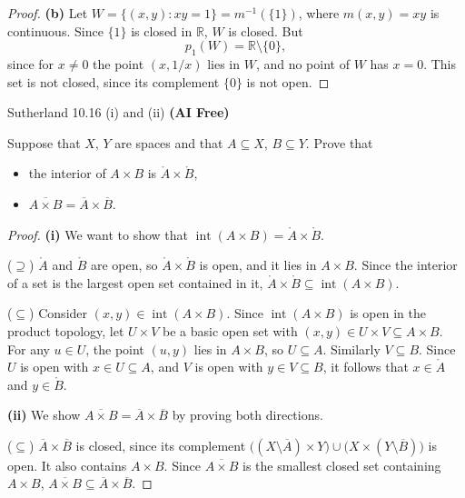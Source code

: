 \documentclass[minion]{homework}
\newcommand{\Reals}{\ensuremath{\mathbb R}}%
\begin{document}
\begin{problems}
\begin{proof}
\textbf{(b)} Let $W = \{(x,y) : xy = 1\} = m^{-1}(\{1\})$, where $m(x,y) = xy$ is continuous. Since $\{1\}$ is closed in $\Reals$, $W$ is closed. But
\[
p_1(W) = \Reals \setminus \{0\},
\]
since for $x \neq 0$ the point $(x, 1/x)$ lies in $W$, and no point of $W$ has $x = 0$. This set is not closed, since its complement $\{0\}$ is not open.
\end{proof}

\problem Sutherland 10.16 (i) and (ii) \textbf{(AI Free)}

Suppose that $X$, $Y$ are spaces and that $A \subseteq X$, $B \subseteq Y$. Prove that
\begin{itemize}
  \item[(i)] the interior of $A \times B$ is $\mathring{A} \times \mathring{B}$,
  \item[(ii)] $\overline{A \times B} = \overline{A} \times \overline{B}$.
\end{itemize}

\begin{proof}
\textbf{(i)} We want to show that $\operatorname{int}(A \times B) = \mathring{A} \times \mathring{B}$.

($\supseteq$) $\mathring{A}$ and $\mathring{B}$ are open, so $\mathring{A} \times \mathring{B}$ is open, and it lies in $A \times B$. Since the interior of a set is the largest open set contained in it, $\mathring{A} \times \mathring{B} \subseteq \operatorname{int}(A \times B)$.

($\subseteq$) Consider $(x,y) \in \operatorname{int}(A \times B)$. Since $\operatorname{int}(A \times B)$ is open in the product topology, let $U \times V$ be a basic open set with $(x,y) \in U \times V \subseteq A \times B$. For any $u \in U$, the point $(u,y)$ lies in $A \times B$, so $U \subseteq A$. Similarly $V \subseteq B$. Since $U$ is open with $x \in U \subseteq A$, and $V$ is open with $y \in V \subseteq B$, it follows that $x \in \mathring{A}$ and $y \in \mathring{B}$.

\textbf{(ii)} We show $\overline{A \times B} = \overline{A} \times \overline{B}$ by proving both directions.

($\subseteq$) $\overline{A} \times \overline{B}$ is closed, since its complement $\big((X \setminus \overline{A}) \times Y\big) \cup \big(X \times (Y \setminus \overline{B})\big)$ is open. It also contains $A \times B$. Since $\overline{A \times B}$ is the smallest closed set containing $A \times B$, $\overline{A \times B} \subseteq \overline{A} \times \overline{B}$.


\end{proof}
\end{problems}
\end{document}
